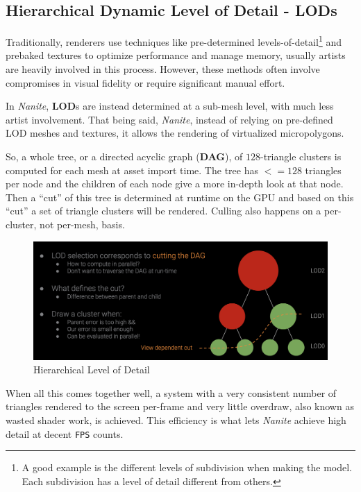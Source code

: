 \documentclass[10pt,journal,compsoc]{IEEEtran}
\begin{document}
\subsection{Hierarchical Dynamic Level of Detail - LODs}

\par Traditionally, renderers use techniques like pre-determined levels-of-detail\footnote{A good example is the different levels of subdivision when making the model. Each subdivision has a level of detail different from others.} and prebaked textures to optimize performance and manage memory, usually artists are heavily involved in this process. However, these methods often involve compromises in visual fidelity or require significant manual effort.

\par In \textit{Nanite}, \textbf{LOD}s are instead determined at a sub-mesh level, with much less artist involvement. That being said, \textit{Nanite}, instead of relying on pre-defined LOD meshes and textures, it allows the rendering of virtualized micropolygons.

\par So, a whole tree, or a directed acyclic graph (\textbf{DAG}), of $128$-triangle clusters is computed for each mesh at asset import time. The tree has $<= 128$ triangles  per node and the children of each node give a more in-depth look at that node. Then a “cut” of this tree is determined at runtime on the GPU and based on this “cut” a set of triangle clusters will be rendered. Culling also happens on a per-cluster, not per-mesh, basis.

\begin{figure}[H]
    \centering
    \includegraphics[scale=0.22]{img/VWe2y.png}
    \caption{Hierarchical Level of Detail\cite{karies_stubbe_wihlidal}}
    \label{fig:LODS}
\end{figure}

\par When all this comes together well,  a system with a very consistent number of triangles rendered to the screen per-frame and very little overdraw, also known as wasted shader work, is achieved. This efficiency is what lets \textit{Nanite} achieve high detail at decent \texttt{FPS} counts.
\end{document}

